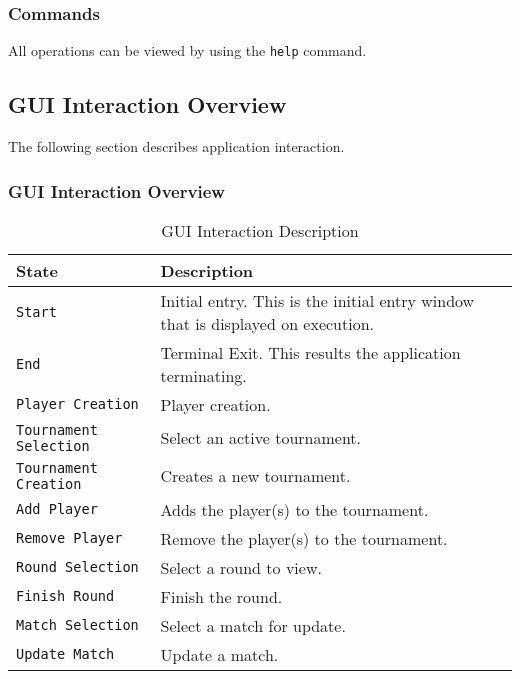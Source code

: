 \documentclass[11pt]{article}
\begin{document}
            \subsubsection{Commands}
                All operations can be viewed by using the \texttt{help} command.
        \newpage

        \subsection{GUI Interaction Overview}
            The following section describes application interaction.
            \subsubsection{GUI Interaction Overview}
                \begin{table*}[h!]
                    \centering
                    \begin{tabulary}{\textwidth}{|p{12em}|p{32em}|}
                        \hline
                        \textbf{State}                      & \textbf{Description} \\
                        \hline
                        \texttt{Start}                      & Initial entry. This is the initial entry window that is displayed on execution.\\
                        \hline
                        \texttt{End}                        & Terminal Exit. This results the application terminating.\\
                        \hline
                        \texttt{Player Creation}            & Player creation.\\
                        \hline
                        \texttt{Tournament Selection}       & Select an active tournament.\\
                        \texttt{Tournament Creation}        & Creates a new tournament.\\
                        \hline
                        \texttt{Add Player}                 & Adds the player(s) to the tournament.\\
                        \hline
                        \texttt{Remove Player}              & Remove the player(s) to the tournament.\\
                        \hline
                        \texttt{Round Selection}            & Select a round to view.\\
                        \hline
                        \texttt{Finish Round}               & Finish the round.\\
                        \hline
                        \texttt{Match Selection}            & Select a match for update.\\
                        \hline
                        \texttt{Update Match}               & Update a match.\\
                        \hline
                        \end{tabulary}
                    \caption{GUI Interaction Description}
                \end{table*}
                \newpage
\end{document}
